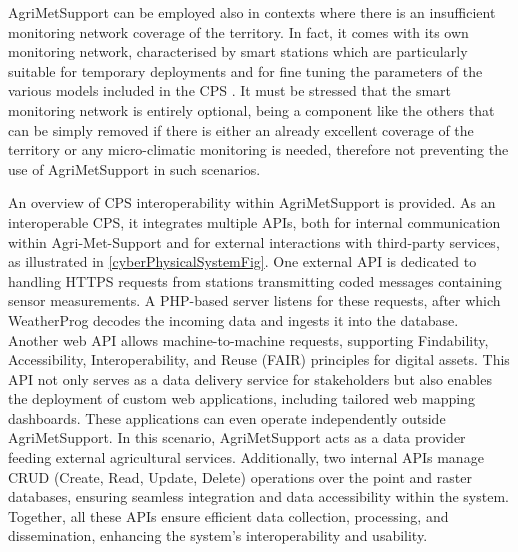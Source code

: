 \documentclass[authoryear,preprint,review,12pt]{elsarticle}
\newcommand{\note}[1]{\emph{\textcolor{red}{#1}}}
\newcommand{\statusblock}[3]{
    \ifthenelse{\equal{#2}{todo}}
        {\textcolor{red}{#1 (TO DO): #3}}
        {}
    \ifthenelse{\equal{#2}{wip}}
        {\textcolor{magenta}{#1 (IN PROGRESS): #3}}
        {}
    \ifthenelse{\equal{#2}{update}}
        {\textcolor{blue}{#1 (UPDATE): #3}}
        {}
    \ifthenelse{\equal{#2}{review}}
        {\textcolor{cyan}{#1 (REVIEW): #3}}
        {}
    \ifthenelse{\equal{#2}{done}}
        {\textcolor{PineGreen}{#1 (READY): #3}}
        {}
}
\begin{document}

AgriMetSupport can be employed also in contexts where there is an insufficient monitoring network coverage of the territory.
In fact, it comes with its own monitoring network, characterised by smart stations which are particularly suitable for temporary deployments and for fine tuning the parameters of the various models included in the CPS \citep{Martino2019AFI}.
It must be stressed that the smart monitoring network is entirely optional, being a component like the others that can be simply removed if there is either an already excellent coverage of the territory or any micro-climatic monitoring is needed, therefore not preventing the use of AgriMetSupport in such scenarios. %

An overview of CPS interoperability within Agri\-Met\-Support is provided.
As an interoperable CPS, it integrates multiple APIs, both for internal communication within Agri-Met-Support and for external interactions with third-party services, as illustrated in \cref{cyberPhysicalSystemFig}.
One external API is dedicated to handling HTTPS requests from stations transmitting coded messages containing sensor measurements. A PHP-based server listens for these requests, after which WeatherProg decodes the incoming data and ingests it into the database.
Another web API allows machine-to-machine requests, supporting Findability, Accessibility, Interoperability, and Reuse (FAIR) principles for digital assets.
This API not only serves as a data delivery service for stakeholders but also enables the deployment of custom web applications, including tailored web mapping dashboards. 
These applications can even operate independently outside Agri\-Met\-Support. 
In this scenario, Agri\-Met\-Support acts as a data provider feeding external agricultural services.
Additionally, two internal APIs manage CRUD (Create, Read, Update, Delete) operations over the point and raster databases, ensuring seamless integration and data accessibility within the system.
Together, all these APIs ensure efficient data collection, processing, and dissemination, enhancing the system’s interoperability and usability.
\end{document}
